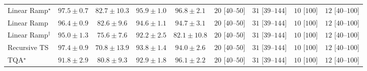 \begin{tabular}{l|cccc|cccc|}
Linear Ramp$^\star$ & {\cellcolor[HTML]{782A05}} \color[HTML]{F1F1F1} $97.5\pm 0.7$ & {\cellcolor[HTML]{FEB23F}} \color[HTML]{000000} $82.7\pm 10.3$ & {\cellcolor[HTML]{8E3104}} \color[HTML]{F1F1F1} $95.9\pm 1.0$ & {\cellcolor[HTML]{812D05}} \color[HTML]{F1F1F1} $96.8\pm 2.1$ & {\cellcolor[HTML]{FDE4E1}} \color[HTML]{000000} $20$ [$40$--$50$] & {\cellcolor[HTML]{FDD8D5}} \color[HTML]{000000} $31$ [$39$--$144$] & {\cellcolor[HTML]{FEEEEB}} \color[HTML]{000000} $10$ [$100$] & {\cellcolor[HTML]{FEECE9}} \color[HTML]{000000} $12$ [$40$--$100$] \\
Linear Ramp & {\cellcolor[HTML]{882F05}} \color[HTML]{F1F1F1} $96.4\pm 0.9$ & {\cellcolor[HTML]{FEB340}} \color[HTML]{000000} $82.6\pm 9.6$ & {\cellcolor[HTML]{A13804}} \color[HTML]{F1F1F1} $94.6\pm 1.1$ & {\cellcolor[HTML]{A03704}} \color[HTML]{F1F1F1} $94.7\pm 3.1$ & {\cellcolor[HTML]{FDE4E1}} \color[HTML]{000000} $20$ [$40$--$50$] & {\cellcolor[HTML]{FDD8D5}} \color[HTML]{000000} $31$ [$39$--$144$] & {\cellcolor[HTML]{FEEEEB}} \color[HTML]{000000} $10$ [$100$] & {\cellcolor[HTML]{FEECE9}} \color[HTML]{000000} $12$ [$40$--$100$] \\
Linear Ramp$^\dagger$ & {\cellcolor[HTML]{9B3504}} \color[HTML]{F1F1F1} $95.0\pm 1.3$ & {\cellcolor[HTML]{FFEFAC}} \color[HTML]{000000} $75.6\pm 7.6$ & {\cellcolor[HTML]{C44802}} \color[HTML]{F1F1F1} $92.2\pm 2.5$ & {\cellcolor[HTML]{FEBA46}} \color[HTML]{000000} $82.1\pm 10.8$ & {\cellcolor[HTML]{FDE4E1}} \color[HTML]{000000} $20$ [$40$--$50$] & {\cellcolor[HTML]{FDD8D5}} \color[HTML]{000000} $31$ [$39$--$144$] & {\cellcolor[HTML]{FEEEEB}} \color[HTML]{000000} $10$ [$100$] & {\cellcolor[HTML]{FEECE9}} \color[HTML]{000000} $12$ [$40$--$100$] \\
Recursive TS & {\cellcolor[HTML]{782A05}} \color[HTML]{F1F1F1} $97.4\pm 0.9$ & {\cellcolor[HTML]{FFFFE5}} \color[HTML]{000000} $70.8\pm 13.9$ & {\cellcolor[HTML]{AC3D03}} \color[HTML]{F1F1F1} $93.8\pm 1.4$ & {\cellcolor[HTML]{AB3C03}} \color[HTML]{F1F1F1} $94.0\pm 2.6$ & {\cellcolor[HTML]{FDE4E1}} \color[HTML]{000000} $20$ [$40$--$50$] & {\cellcolor[HTML]{FDD8D5}} \color[HTML]{000000} $31$ [$39$--$144$] & {\cellcolor[HTML]{FEEEEB}} \color[HTML]{000000} $10$ [$100$] & {\cellcolor[HTML]{FEECE9}} \color[HTML]{000000} $12$ [$40$--$100$] \\
TQA$^\star$ & {\cellcolor[HTML]{CB4B02}} \color[HTML]{F1F1F1} $91.8\pm 2.9$ & {\cellcolor[HTML]{FEC859}} \color[HTML]{000000} $80.8\pm 9.3$ & {\cellcolor[HTML]{BB4403}} \color[HTML]{F1F1F1} $92.9\pm 1.8$ & {\cellcolor[HTML]{8B3005}} \color[HTML]{F1F1F1} $96.1\pm 2.2$ & {\cellcolor[HTML]{FDE4E1}} \color[HTML]{000000} $20$ [$40$--$50$] & {\cellcolor[HTML]{FDD8D5}} \color[HTML]{000000} $31$ [$39$--$144$] & {\cellcolor[HTML]{FEEEEB}} \color[HTML]{000000} $10$ [$100$] & {\cellcolor[HTML]{FEECE9}} \color[HTML]{000000} $12$ [$40$--$100$] \\

\end{tabular}
